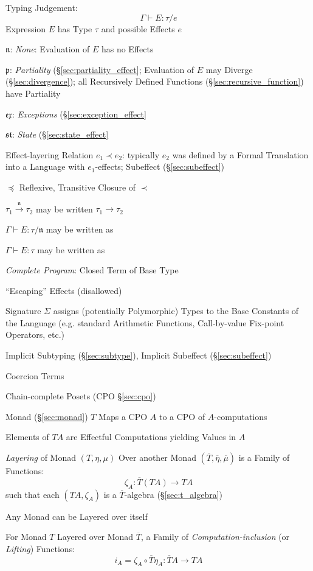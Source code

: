 Typing Judgement:
\[
  \Gamma \vdash E : \tau / e
\]
Expression $E$ has Type $\tau$ and possible Effects $e$

$\mathfrak{n}$: \emph{None}: Evaluation of $E$ has no Effects

$\mathfrak{p}$: \emph{Partiality} (\S\ref{sec:partiality_effect};
Evaluation of $E$ may Diverge (\S\ref{sec:divergence}); all
Recursively Defined Functions (\S\ref{sec:recursive_function}) have
Partiality

$\mathfrak{ex}$: \emph{Exceptions} (\S\ref{sec:exception_effect}

$\mathfrak{st}$: \emph{State} (\S\ref{sec:state_effect}

Effect-layering Relation $e_1 \prec e_2$: typically $e_2$ was defined
by a Formal Translation into a Language with $e_1$-effects; Subeffect
(\S\ref{sec:subeffect})

$\preceq$ Reflexive, Transitive Closure of $\prec$

$\tau_1 \xrightarrow{\mathfrak{n}} \tau_2$ may be written $\tau_1
\rightarrow \tau_2$

$\Gamma \vdash E : \tau / \mathfrak{n}$ may be written as

$\Gamma \vdash E : \tau$ may be written as

\emph{Complete Program}: Closed Term of Base Type

``Escaping'' Effects (disallowed)

Signature $\Sigma$ assigns (potentially Polymorphic) Types to the Base
Constants of the Language (e.g. standard Arithmetic Functions,
Call-by-value Fix-point Operators, etc.)

Implicit Subtyping (\S\ref{sec:subtype}), Implicit Subeffect
(\S\ref{sec:subeffect})

Coercion Terms

Chain-complete Posets (CPO \S\ref{sec:cpo})

Monad (\S\ref{sec:monad}) $T$ Maps a CPO $A$ to a CPO of
$A$-computations

Elements of $T A$ are Effectful Computations yielding Values in $A$

\emph{Layering} of Monad $(T,\eta,\mu)$ Over another Monad
$(\overline{T}, \overline{\eta}, \overline{\mu})$ is a Family of
Functions:
\[
  \zeta_A : \overline{T}(T A) \rightarrow T A
\]
such that each $(T A, \zeta_A)$ is a $\overline{T}$-algebra
(\S\ref{sec:t_algebra}) %

Any Monad can be Layered over itself %

For Monad $T$ Layered over Monad $\overline{T}$, a Family of
\emph{Computation-inclusion} (or \emph{Lifting}) Functions:
\[
  i_A = \zeta_A \circ \overline{T} \eta_A :
    \overline{T} A \rightarrow T A
\]

